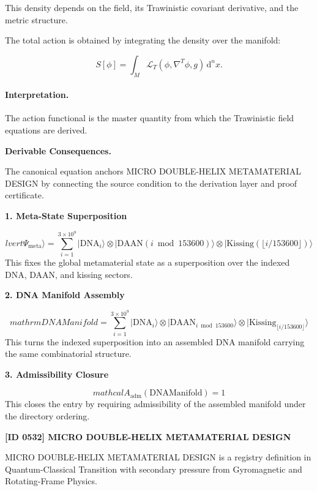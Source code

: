 This density depends on the field, its Trawinistic covariant derivative, and the metric structure.

The total action is obtained by integrating the density over the manifold:

\begin{equation}
\boxed{
S[\phi]
=
\int_M
\mathcal{L}_T
\left(
\phi,\nabla^T\phi,g
\right)
\,\mathrm{d}^n x .
}
\end{equation}

\paragraph{Interpretation.}
The action functional is the master quantity from which the Trawinistic field equations are derived.

\par\vspace{0.35em}
\noindent\textbf{Derivable Consequences.}\quad
\begingroup
\footnotesize
\raggedright
The canonical equation anchors MICRO DOUBLE-HELIX METAMATERIAL DESIGN by connecting the source condition to the derivation layer and proof certificate.
\par\endgroup

\noindent\textbf{1. Meta-State Superposition}\par
\[
lvert \Psi_{\mathrm{meta}}\rangle = \sum_{i=1}^{3\times 10^{9}} \lvert \mathrm{DNA}_{i}\rangle \otimes \lvert \mathrm{DAAN}(i \bmod 153600)\rangle \otimes \lvert \mathrm{Kissing}(\lfloor i/153600 \rfloor)\rangle
\]
\noindent This fixes the global metamaterial state as a superposition over the indexed DNA, DAAN, and kissing sectors.\par
\noindent\textbf{2. DNA Manifold Assembly}\par
\[
mathrm{DNAManifold} = \sum_{i=1}^{3\times 10^{9}} \lvert \mathrm{DNA}_{i}\rangle \otimes \lvert \mathrm{DAAN}_{i \bmod 153600}\rangle \otimes \lvert \mathrm{Kissing}_{\lfloor i/153600 \rfloor}\rangle
\]
\noindent This turns the indexed superposition into an assembled DNA manifold carrying the same combinatorial structure.\par
\noindent\textbf{3. Admissibility Closure}\par
\[
mathcal{A}_{\mathrm{adm}}\!\left(\mathrm{DNAManifold}\right)=1
\]
\noindent This closes the entry by requiring admissibility of the assembled manifold under the directory ordering.\par

\clearpage
\noindent\textbf{[ID 0532] MICRO DOUBLE-HELIX METAMATERIAL DESIGN}\par
\vspace{0.35em}
\begingroup\small
{}
MICRO DOUBLE-HELIX METAMATERIAL DESIGN is a registry definition in Quantum-Classical Transition with secondary pressure from Gyromagnetic and Rotating-Frame Physics.

